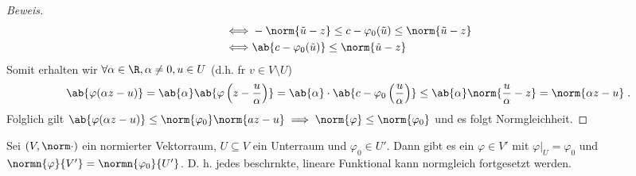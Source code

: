\begin{proof}[Beweis]
\begin{align*}
			\iff & 	- \norm{\tilde u - z} \leq c - \varphi_0 (\tilde u) \leq \norm{\tilde u -z}	
			\\
			\iff & \ab{c-\varphi_0(\tilde u)} \leq \norm{\tilde u -z}
			\end{align*}
			Somit erhalten wir \(\forall \alpha \in \R, \alpha \neq 0, u \in U\) (d.h. f\us r \(v\in V\setminus U\))
			\[\ab{\varphi(\alpha z -u)} = \ab{\alpha} \ab{\varphi\left(z - \frac{u}{\alpha}\right)} = \ab{\alpha} \cdot \ab{c - \varphi_0\left(\frac{u}{\alpha}\right)} \leq \ab{\alpha}\norm{\frac{u}{\alpha}-z} = \norm{\alpha z -u}\;.\]
			Folglich gilt 
			\(\ab{\varphi(\alpha z -u)} \leq \norm{\varphi_0} \norm{az - u}\implies \norm{\varphi} \leq \norm{\varphi_0}\) und es folgt Normgleichheit.
	\end{proof}
	
\begin{theorem}
	Sei \((V,\norm\cdot)\) ein normierter Vektorraum, \(U\subseteq V\) ein Unterraum und \(\varphi_0 \in U'\). Dann gibt es ein \(\varphi \in V'\) mit \(\varphi\vert_U = \varphi_0\) und \(\normn{\varphi}{V'} = \normn{\varphi_0}{U'}\). D. h. jedes beschr\as nkte, lineare Funktional kann normgleich fortgesetzt werden. 
\end{theorem}
